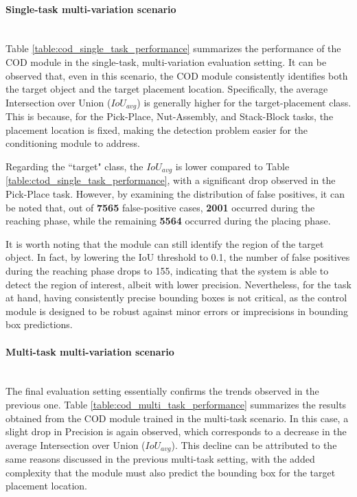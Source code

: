 
\paragraph*{Single-task multi-variation scenario}\mbox{}\\
Table \ref{table:cod_single_task_performance} summarizes the performance of the COD module in the single-task, multi-variation evaluation setting. It can be observed that, even in this scenario, the COD module consistently identifies both the target object and the target placement location. Specifically, the average Intersection over Union ($IoU_{avg}$) is generally higher for the target-placement class. This is because, for the Pick-Place, Nut-Assembly, and Stack-Block tasks, the placement location is fixed, making the detection problem easier for the conditioning module to address. 

Regarding the ``target" class, the $IoU_{avg}$ is lower compared to Table \ref{table:ctod_single_task_performance}, with a significant drop observed in the Pick-Place task. However, by examining the distribution of false positives, it can be noted that, out of \textbf{7565} false-positive cases, \textbf{2001} occurred during the reaching phase, while the remaining \textbf{5564} occurred during the placing phase. 

It is worth noting that the module can still identify the region of the target object. In fact, by lowering the IoU threshold to 0.1, the number of false positives during the reaching phase drops to 155, indicating that the system is able to detect the region of interest, albeit with lower precision. Nevertheless, for the task at hand, having consistently precise bounding boxes is not critical, as the control module is designed to be robust against minor errors or imprecisions in bounding box predictions.


\paragraph*{Multi-task multi-variation scenario}\mbox{}\\
The final evaluation setting essentially confirms the trends observed in the previous one. Table \ref{table:cod_multi_task_performance} summarizes the results obtained from the COD module trained in the multi-task scenario. In this case, a slight drop in Precision is again observed, which corresponds to a decrease in the average Intersection over Union ($IoU_{avg}$). This decline can be attributed to the same reasons discussed in the previous multi-task setting, with the added complexity that the module must also predict the bounding box for the target placement location.


